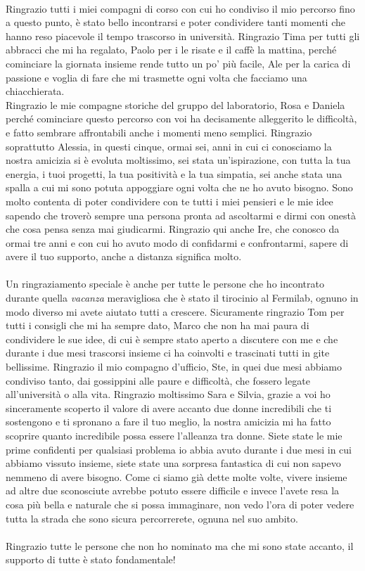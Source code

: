 \paragraph{}
Ringrazio tutti i miei compagni di corso con cui ho condiviso il mio percorso fino a questo punto, è stato bello incontrarsi e poter condividere tanti momenti che hanno reso piacevole il tempo trascorso in università.
Ringrazio Tima per tutti gli abbracci che mi ha regalato, Paolo per i le risate e il caffè la mattina, perché cominciare la giornata insieme rende tutto un po' più facile, Ale per la carica di passione e voglia di fare che mi trasmette ogni volta che facciamo una chiacchierata.\\
Ringrazio le mie compagne storiche del gruppo del laboratorio, Rosa e Daniela perché cominciare questo percorso con voi ha decisamente alleggerito le difficoltà, e fatto sembrare affrontabili anche i momenti meno semplici. 
Ringrazio soprattutto Alessia, in questi cinque, ormai sei, anni in cui ci conosciamo la nostra amicizia si è evoluta moltissimo, sei stata un'ispirazione, con tutta la tua energia, i tuoi progetti, la tua positività e la tua simpatia, sei anche stata una spalla a cui mi sono potuta appoggiare ogni volta che ne ho avuto bisogno.
Sono molto contenta di poter condividere con te tutti i miei pensieri e le mie idee sapendo che troverò sempre una persona pronta ad ascoltarmi e dirmi con onestà che cosa pensa senza mai giudicarmi.
Ringrazio qui anche Ire, che conosco da ormai tre anni e con cui ho avuto modo di confidarmi e confrontarmi, sapere di avere il tuo supporto, anche a distanza significa molto.
\paragraph{}
Un ringraziamento speciale è anche per tutte le persone che ho incontrato durante quella \textit{vacanza} meravigliosa che è stato il tirocinio al Fermilab, ognuno in modo diverso mi avete aiutato tutti a crescere.
Sicuramente ringrazio Tom per tutti i consigli che mi ha sempre dato, Marco che non ha mai paura di condividere le sue idee, di cui è sempre stato aperto a discutere con me e che durante i due mesi trascorsi insieme ci ha coinvolti e trascinati tutti in gite bellissime.
Ringrazio il mio compagno d'ufficio, Ste, in quei due mesi abbiamo condiviso tanto, dai gossippini alle paure e difficoltà, che fossero legate all'università o alla vita. 
Ringrazio moltissimo Sara e Silvia, grazie a voi ho sinceramente scoperto il valore di avere accanto due donne incredibili che ti sostengono e ti spronano a fare il tuo meglio, la nostra amicizia mi ha fatto scoprire quanto incredibile possa essere l'alleanza tra donne. 
Siete state le mie prime confidenti per qualsiasi problema io abbia avuto durante i due mesi in cui abbiamo vissuto insieme, siete state una sorpresa fantastica di cui non sapevo nemmeno di avere bisogno.
Come ci siamo già dette molte volte, vivere insieme ad altre due sconosciute avrebbe potuto essere difficile e invece l'avete resa la cosa più bella e naturale che si possa immaginare, non vedo l'ora di poter vedere tutta la strada che sono sicura percorrerete, ognuna nel suo ambito.
\paragraph{}
Ringrazio tutte le persone che non ho nominato ma che mi sono state accanto, il supporto di tutte è stato fondamentale!
